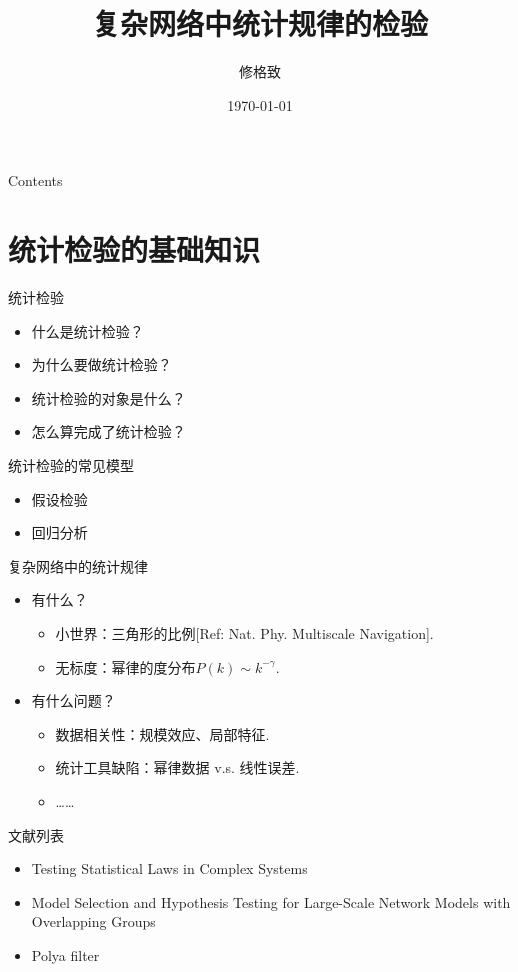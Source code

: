 \documentclass{beamer}
\title{复杂网络中统计规律的检验}
\author{修格致}
\institute{IRSGIS\\ Peking University}
\date{\today}
\begin{document}
    \maketitle    
\begin{frame}{Contents}
    \tableofcontents
\end{frame}
\section{统计检验的基础知识}
\begin{frame}{统计检验}
    \begin{itemize}
        \item 什么是统计检验？
        \item 为什么要做统计检验？
        \item 统计检验的对象是什么？
        \item 怎么算完成了统计检验？
    \end{itemize}
\end{frame}
\begin{frame}{统计检验的常见模型}
    \begin{itemize}
        \item 假设检验
        \item 回归分析
    \end{itemize}
\end{frame}
\begin{frame}{复杂网络中的统计规律}
    \begin{itemize}
        \item 有什么？
        \begin{itemize}
            \item 小世界：三角形的比例[Ref: Nat. Phy. Multiscale Navigation].
            \item 无标度：幂律的度分布$P(k)\sim k^{-\gamma}$.
        \end{itemize}
        \item 有什么问题？
        \begin{itemize}
            \item 数据相关性：规模效应、局部特征.
            \item 统计工具缺陷：幂律数据 v.s. 线性误差.
            \item \dots\dots
        \end{itemize}
    \end{itemize}
\end{frame}
\begin{frame}{文献列表}
    \begin{itemize}
        \item Testing Statistical Laws in Complex Systems
    \item Model Selection and Hypothesis Testing for Large-Scale Network Models with Overlapping Groups
    \item Polya filter
    \end{itemize}
\end{frame}
\end{document}
